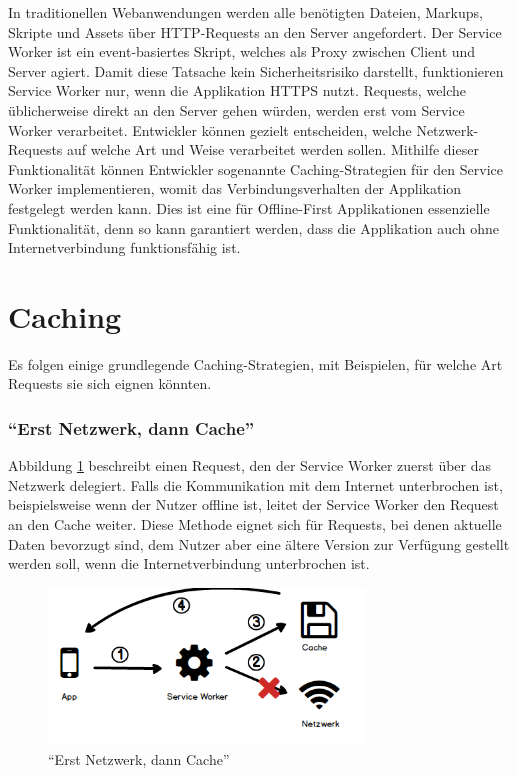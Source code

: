 \documentclass[a4paper, 12pt]{scrreprt}
\begin{document}
In traditionellen Webanwendungen werden alle benötigten Dateien, Markups, Skripte und Assets über \ac{HTTP}-Requests an den Server angefordert. Der Service Worker ist ein event-basiertes Skript, welches als Proxy zwischen Client und Server agiert. Damit diese Tatsache kein Sicherheitsrisiko darstellt, funktionieren Service Worker nur, wenn die Applikation \ac{HTTPS} nutzt. Requests, welche üblicherweise direkt an den Server gehen würden, werden erst vom Service Worker verarbeitet. Entwickler können gezielt entscheiden, welche Netzwerk-Requests auf welche Art und Weise verarbeitet werden sollen. Mithilfe dieser Funktionalität können Entwickler sogenannte Caching-Strategien für den Service Worker implementieren, womit das Verbindungsverhalten der Applikation festgelegt werden kann\autocite{OnlineServiceWorkersAnIntroduction}. Dies ist eine für Offline-First Applikationen essenzielle Funktionalität, denn so kann garantiert werden, dass die Applikation auch ohne Internetverbindung funktionsfähig ist. 

\section{Caching}

Es folgen einige grundlegende Caching-Strategien, mit Beispielen, für welche Art Requests sie sich eignen könnten.

\subsubsection{\enquote{Erst Netzwerk, dann Cache}}
Abbildung \ref{fig:cachingNetworkFirst} beschreibt einen Request, den der Service Worker zuerst über das Netzwerk delegiert. Falls die Kommunikation mit dem Internet unterbrochen ist, beispielsweise wenn der Nutzer offline ist, leitet der Service Worker den Request an den Cache weiter. Diese Methode eignet sich für Requests, bei denen aktuelle Daten bevorzugt sind, dem Nutzer aber eine ältere Version zur Verfügung gestellt werden soll, wenn die Internetverbindung unterbrochen ist.

\begin{figure}[h]
	\centering
	\includegraphics[width=0.75\textwidth]{networkfirst.png}
	\caption{\enquote{Erst Netzwerk, dann Cache}}
	\label{fig:cachingNetworkFirst}
\end{figure}
\end{document}
